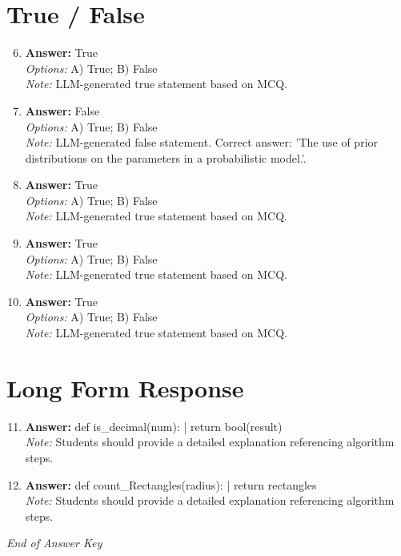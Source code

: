 \documentclass[12pt]{article}
\begin{document}
\section*{True / False}
\begin{enumerate}[label=\arabic*.]
\setcounter{enumi}{5}
\item \textbf{Answer:} True
\\ \textit{Options:} A) True; B) False
\\ \textit{Note:} LLM-generated true statement based on MCQ.
\item \textbf{Answer:} False
\\ \textit{Options:} A) True; B) False
\\ \textit{Note:} LLM-generated false statement. Correct answer: 'The use of prior distributions on the parameters in a probabilistic model.'.
\item \textbf{Answer:} True
\\ \textit{Options:} A) True; B) False
\\ \textit{Note:} LLM-generated true statement based on MCQ.
\item \textbf{Answer:} True
\\ \textit{Options:} A) True; B) False
\\ \textit{Note:} LLM-generated true statement based on MCQ.
\item \textbf{Answer:} True
\\ \textit{Options:} A) True; B) False
\\ \textit{Note:} LLM-generated true statement based on MCQ.
\end{enumerate}

\section*{Long Form Response}
\begin{enumerate}[label=\arabic*.]
\setcounter{enumi}{10}
\item \textbf{Answer:} def is\_decimal(num): | return bool(result)
\\ \textit{Note:} Students should provide a detailed explanation referencing algorithm steps.
\item \textbf{Answer:} def count\_Rectangles(radius): | return rectangles
\\ \textit{Note:} Students should provide a detailed explanation referencing algorithm steps.
\end{enumerate}

\vfill
\noindent\textit{End of Answer Key}
\end{document}
